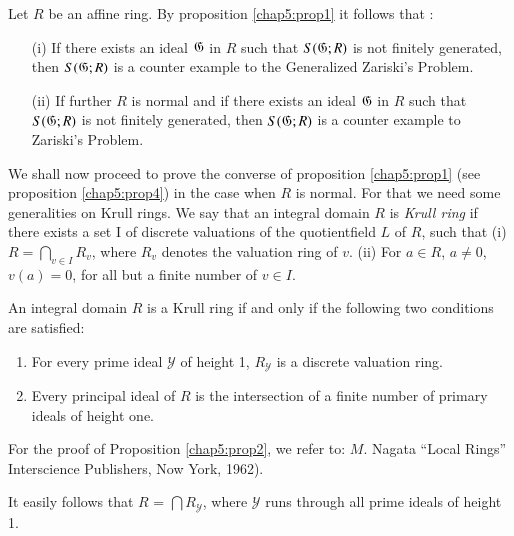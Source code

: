 Let $R$ be an affine ring. By proposition \ref{chap5:prop1} it follows that : 
\begin{itemize}
\item[{\rm (i)}] If there exists an ideal $\mathfrak{G}$ in $R$ such that
  $S(\mathfrak{G} ;R)$ is not finitely generated, then $S(\mathfrak{G} ; R)$ is a
  counter example to the Generalized Zariski's Problem. 

\item[{\rm (ii)}] If further $R$ is normal and if there exists an
  ideal $\mathfrak{G}$ in $R$ such that $S(\mathfrak{G} ; R)$ is not finitely generated,
  then $S(\mathfrak{G} ; R)$ is a counter example to Zariski's Problem.  
\end{itemize}


\medskip
{}

We shall now proceed to prove the converse of proposition \ref{chap5:prop1} (see
proposition \ref{chap5:prop4}) in the case when $R$ is normal. For
that we need some 
generalities on Krull rings. We say that an integral domain $R$ is
\textit{Krull ring} if there exists a set I of discrete valuations of
the quotient\pageoriginale field $L$ of $R$, such that (i) $R =
\bigcap\limits_{v \in I }  R_{v}$, where  $R_{v}$ denotes the
valuation  ring of $v$. \break  (ii) For  $a \in R$, $a \neq 0$, $v (a) = 0$,
for all but a finite number of  $v \in I$.   

\begin{proposition}\label{chap5:prop2}%
  An integral domain $R$  is a Krull ring if and only if the following
  two conditions are satisfied: 
  \begin{enumerate}[{\rm (i)}]
  \item  For every prime  ideal $\mathscr{Y}$ of height 1, 
  $R_{\mathscr{Y}}$  is a discrete valuation ring.

  \item Every  principal  ideal of $R$ is  the intersection of a
    finite number of primary ideals of height one. 
  \end{enumerate}
\end{proposition}

  For the proof  of Proposition \ref{chap5:prop2}, we refer to:
  $M$. Nagata ``Local 
  Rings''  Interscience  Publishers, Now York, 1962). 

\setcounter{rem}{0}
\begin{rem}%
  It easily follows that $R$ = $\bigcap R_{\mathscr{Y}}$, where
  $\mathscr{Y} $ runs through all prime ideals of height 1. 
\end{rem}

